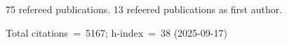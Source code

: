 75 refereed publications. 13 refeered publications as first author.

Total citations~=~5167; h-index~=~38 (2025-09-17)